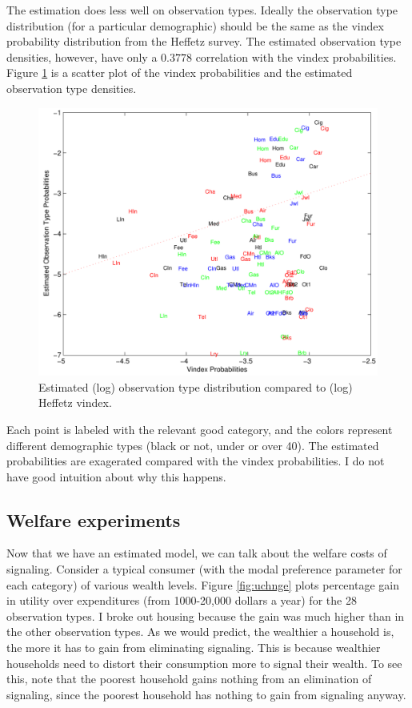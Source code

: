 \documentclass{article}
\begin{document}
The estimation does less well on observation types.
Ideally the observation type distribution (for a particular demographic) should be the same as the vindex probability distribution from the Heffetz survey.
The estimated observation type densities, however, have only a $0.3778$ correlation with the vindex probabilities.
Figure \ref{fig:vinmatch} is a scatter plot of the vindex probabilities and the estimated observation type densities.
\begin{figure}
	\begin{center}
		\includegraphics[scale=.8]{pics/vinmatch_cropped.pdf}
	\end{center}
	\caption{Estimated (log) observation type distribution compared to (log) Heffetz vindex.}
	\label{fig:vinmatch}
\end{figure}
Each point is labeled with the relevant good category, and the colors represent different demographic types (black or not, under or over 40).
The estimated probabilities are exagerated compared with the vindex probabilities.
I do not have good intuition about why this happens.

\subsection{Welfare experiments}
Now that we have an estimated model, we can talk about the welfare costs of signaling.
Consider a typical consumer (with the modal preference parameter for each category) of various wealth levels.  
Figure \ref{fig:uchnge} plots percentage gain in utility over expenditures (from 1000-20,000 dollars a year) for the 28  observation types.
I broke out housing because the gain was much higher than in the other observation types.
As we would  predict, the wealthier a household is, the more it has to gain from eliminating signaling.
This is because wealthier households need to distort their consumption more to signal their wealth. 
To see this, note that the poorest household gains nothing from an elimination of signaling, since the poorest household has nothing to gain from signaling anyway.
\end{document}
